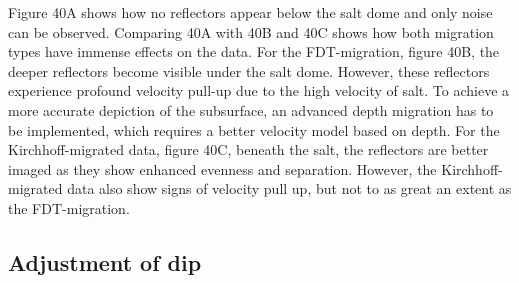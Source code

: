 \documentclass[10pt,a4paper]{article}
\begin{document}
\noindent Figure 40A shows how no reflectors appear below the salt dome and only noise can be observed. Comparing 40A with 40B and 40C shows how both migration types have immense effects on the data. For the FDT-migration, figure 40B, the deeper reflectors become visible under the salt dome. However, these reflectors experience profound velocity pull-up due to the high velocity of salt. To achieve a more accurate depiction of the subsurface, an advanced depth migration has to be implemented, which requires a better velocity model based on depth. For the Kirchhoff-migrated data, figure 40C, beneath the salt, the reflectors are better imaged as they show enhanced evenness and separation. However, the Kirchhoff-migrated data also show signs of velocity pull up, but not to as great an extent as the FDT-migration. 

\subsection{Adjustment of dip}
\end{document}
